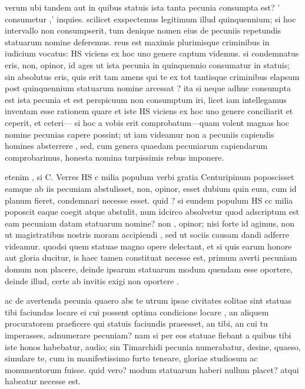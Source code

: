  verum ubi tandem aut in quibus statuis ista tanta pecunia consumpta est? ' consumetur ,' inquies. scilicet exspectemus legitimum illud quinquennium; si hoc intervallo non consumpserit, tum denique nomen eius de pecuniis repetundis statuarum nomine deferemus. reus est maximis plurimisque criminibus in iudicium vocatus: HS viciens ex hoc uno genere captum videmus. si condemnatus eris, non, opinor, id ages ut ista pecunia in quinquennio consumatur in statuis; sin absolutus eris, quis erit tam amens qui te ex tot tantisque criminibus elapsum post quinquennium statuarum nomine arcessat ? ita si neque adhuc consumpta est ista pecunia et est perspicuum non consumptum iri, licet iam intellegamus inventam esse rationem quare et iste HS viciens ex hoc uno genere conciliarit et ceperit, et ceteri— si hoc a vobis erit comprobatum—quam volent magnas hoc nomine pecunias capere possint; ut iam videamur non a pecuniis capiendis homines absterrere , sed, cum genera quaedam pecuniarum capiendarum comprobarimus, honesta nomina turpissimis rebus imponere.

 etenim , si C. Verres HS c milia populum verbi gratia Centuripinum poposcisset eamque ab iis pecuniam abstulisset, non, opinor, esset dubium quin eum, cum id planum fieret, condemnari necesse esset. quid ? si eundem populum HS cc milia poposcit eaque coegit atque abstulit, num idcirco absolvetur quod adscriptum est eam pecuniam datam statuarum nomine? non , opinor; nisi forte id agimus, non ut magistratibus nostris moram accipiendi , sed ut sociis causam dandi adferre videamur. quodsi quem statuae magno opere delectant, et si quis earum honore aut gloria ducitur, is haec tamen constituat necesse est, primum averti pecuniam domum non placere, deinde ipsarum statuarum modum quendam esse oportere, deinde illud, certe ab invitis exigi non oportere .

 ac de avertenda pecunia quaero abs te utrum ipsae civitates solitae sint statuas tibi faciundas locare ei cui possent optima condicione locare , an aliquem procuratorem praeficere qui statuis faciundis praeesset, an tibi, an cui tu imperasses, adnumerare pecuniam? nam si per eos statuae fiebant a quibus tibi iste honos habebatur, audio; sin Timarchidi pecunia numerabatur, desine, quaeso, simulare te, cum in manifestissimo furto teneare, gloriae studiosum ac monumentorum fuisse. quid vero? modum statuarum haberi nullum placet? atqui habeatur necesse est.

